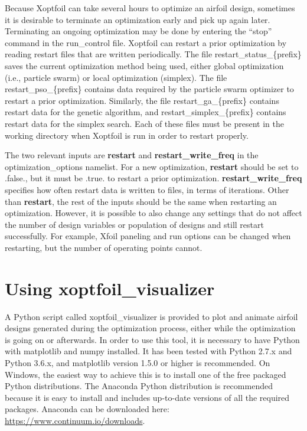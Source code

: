 \documentclass[11pt]{article}
\begin{document}
Because Xoptfoil can take several hours to optimize an airfoil design, sometimes it is
desirable to terminate an optimization early and pick up again later. Terminating an
ongoing optimization may be done by entering the ``stop'' command in the run\_control
file. Xoptfoil can restart a prior optimization
by reading restart files that are written periodically. The file
restart\_status\_\{prefix\}
saves the current optimization method being used, either global optimization (i.e.,
particle swarm) or local optimization (simplex).  The file restart\_pso\_\{prefix\} contains
data required by the particle swarm optimizer to restart a prior optimization. Similarly,
the file restart\_ga\_\{prefix\} contains restart data for the genetic algorithm,
and restart\_simplex\_\{prefix\} contains restart data for the simplex search.
Each of these files must be
present in the working directory when Xoptfoil is run in order to restart properly.

The two relevant inputs are \textbf{restart} and \textbf{restart\_write\_freq} in the
optimization\_options namelist.  For a new optimization, \textbf{restart} should be set to
.false., but it must be .true. to restart a prior optimization.
\textbf{restart\_write\_freq} specifies how often restart data is written to files, in
terms of iterations.  Other than \textbf{restart}, the rest of the inputs should be the
same when restarting an optimization.  However, it is possible to also change any settings
that do not affect the number of design variables or population of designs and still
restart successfully.  For example, Xfoil paneling and run options can be changed when
restarting, but the number of operating points cannot. 

\section{Using xoptfoil\_visualizer}\label{sec:xoptfoil_visualizer}

A Python script called xoptfoil\_visualizer is provided to plot and animate airfoil
designs generated during the optimization process, either while the optimization is going
on or afterwards.  In order to use this tool, it is
necessary to have Python with matplotlib and numpy installed. It has been tested with
Python 2.7.x and Python 3.6.x, and matplotlib version 1.5.0 or higher is recommended.
On Windows, the easiest
way to achieve this is to install one of the free packaged Python distributions.  The
Anaconda Python distribution is recommended because it is easy to install and includes
up-to-date versions of all the required packages.  Anaconda can be downloaded here:
\url{https://www.continuum.io/downloads}.
\end{document}
